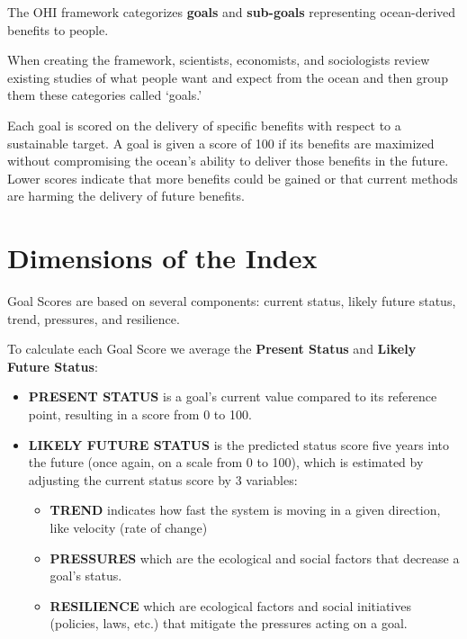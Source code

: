 \documentclass[
]{book}
\providecommand{\tightlist}{%
  \setlength{\itemsep}{0pt}\setlength{\parskip}{0pt}}
\begin{document}
The OHI framework categorizes \textbf{goals} and \textbf{sub-goals} representing ocean-derived benefits to people.

When creating the framework, scientists, economists, and sociologists review existing studies of what people want and expect from the ocean and then group them these categories called `goals.'

Each goal is scored on the delivery of specific benefits with respect to a sustainable target. A goal is given a score of 100 if its benefits are maximized without compromising the ocean's ability to deliver those benefits in the future. Lower scores indicate that more benefits could be gained or that current methods are harming the delivery of future benefits.

\hypertarget{dimensions-of-the-index}{%
\section*{Dimensions of the Index}\label{dimensions-of-the-index}}

Goal Scores are based on several components: current status, likely future status, trend, pressures, and resilience.

To calculate each Goal Score we average the \textbf{Present Status} and \textbf{Likely Future Status}:

\begin{itemize}
\item
  \textbf{PRESENT STATUS} is a goal's current value compared to its reference point, resulting in a score from 0 to 100.
\item
  \textbf{LIKELY FUTURE STATUS} is the predicted status score five years into the future (once again, on a scale from 0 to 100), which is estimated by adjusting the current status score by 3 variables:

  \begin{itemize}
  \tightlist
  \item
    \textbf{TREND} indicates how fast the system is moving in a given direction, like velocity (rate of change)
  \item
    \textbf{PRESSURES} which are the ecological and social factors that decrease a goal's status.
  \item
    \textbf{RESILIENCE} which are ecological factors and social initiatives (policies, laws, etc.) that mitigate the pressures acting on a goal.
  \end{itemize}
\end{itemize}
\end{document}
